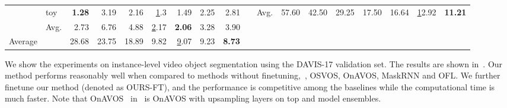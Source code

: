 \begin{table}[t]
{{\begin{tabular}{llrrrrrrrllrrrrrrr}
	& toy           & \bf 1.28  & 3.19  & 2.16  & {\ul 1.3}   & 1.49  & 2.25  & 2.81 &         & Avg.       & 57.60 & 42.50 & 29.25 & 17.50 & 16.64 & {\ul 12.92} & \bf 11.21 \\ \cline{2-9}
	& Avg.          & 2.73  & 6.76  & 4.88  & {\ul 2.17}  & \bf 2.06  & 3.28  & 3.90 &         &            &       &       &       &       &       &       &      \\ 
	\midrule[1pt]
	Average & & 28.68  & 23.75 & 18.89 & 9.82 & {\ul 9.07} & 9.23 & \bf 8.73 &         &            &       &       &       &       &       &       &     \\
	\bottomrule
\end{tabular}
}
}
\end{table} 
\begin{table}[t]
	\centering
	{\footnotesize
		
		\caption{Evaluation on the DAVIS-17 validation set.
		}
		\label{tab:davis17}
		\tabcolsep=2pt
}
\end{table} We show the experiments on instance-level video object segmentation using the DAVIS-17 validation set. The results are shown in~. Our method performs reasonably well when compared to methods without finetuning,~\ie, OSVOS, OnAVOS, MaskRNN and OFL. We further finetune our method (denoted as OURS-FT), and the performance is competitive among the baselines while the computational time is much faster. Note that OnAVOS~\cite{DAVIS2017_5th} in~ is OnAVOS with upsampling layers on top and model ensembles.



